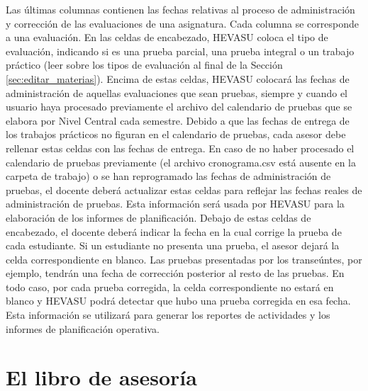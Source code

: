 \documentclass[letterpaper,12pt]{book}
\begin{document}
Las últimas columnas contienen las fechas relativas al proceso de administración y corrección de las evaluaciones de una asignatura. Cada columna se corresponde a una evaluación. En las celdas de encabezado, HEVASU coloca el tipo de evaluación, indicando si es una prueba parcial, una prueba integral o un trabajo práctico (leer sobre los tipos de evaluación al final de la Sección \ref{sec:editar_materias}). Encima de estas celdas, HEVASU colocará las fechas de administración de aquellas evaluaciones que sean pruebas, siempre y cuando el usuario haya procesado previamente el archivo del calendario de pruebas que se elabora por Nivel Central cada semestre.  Debido a que las fechas de entrega de los trabajos prácticos no figuran en el calendario de pruebas, cada asesor debe rellenar estas celdas con las fechas de entrega.  En caso de no haber procesado el calendario de pruebas previamente (el archivo cronograma.csv está ausente en la carpeta de trabajo) o se han reprogramado las fechas de administración de pruebas, el docente deberá actualizar estas celdas para reflejar las fechas reales de administración de pruebas.  Esta información será usada por HEVASU para la elaboración de los informes de planificación.  Debajo de estas celdas de encabezado, el docente deberá indicar la fecha en la cual corrige la prueba de cada estudiante. Si un estudiante no presenta una prueba, el asesor dejará la celda correspondiente en blanco. Las pruebas presentadas por los transeúntes, por ejemplo, tendrán una fecha de corrección posterior al resto de las pruebas.  En todo caso, por cada prueba corregida, la celda correspondiente no estará en blanco y HEVASU podrá detectar que hubo una prueba corregida en esa fecha. Esta información se utilizará para generar los reportes de actividades y los informes de planificación operativa.

\section{El libro de asesoría}
\end{document}
